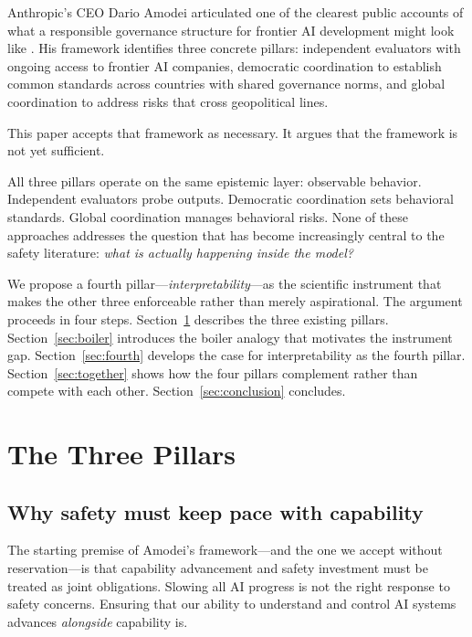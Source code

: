 \documentclass[12pt]{article}
\begin{document}
Anthropic's CEO Dario Amodei articulated one of the clearest public accounts
of what a responsible governance structure for frontier AI development might
look like \cite{amodei2025pace}. His framework identifies three concrete
pillars: independent evaluators with ongoing access to frontier AI companies,
democratic coordination to establish common standards across countries with
shared governance norms, and global coordination to address risks that cross
geopolitical lines.

This paper accepts that framework as necessary. It argues that the framework
is not yet sufficient.

All three pillars operate on the same epistemic layer: observable behavior.
Independent evaluators probe outputs. Democratic coordination sets behavioral
standards. Global coordination manages behavioral risks. None of these
approaches addresses the question that has become increasingly central to the
safety literature: \emph{what is actually happening inside the model?}

We propose a fourth pillar---\emph{interpretability}---as the scientific
instrument that makes the other three enforceable rather than merely
aspirational. The argument proceeds in four steps. Section~\ref{sec:pillars}
describes the three existing pillars. Section~\ref{sec:boiler} introduces the
boiler analogy that motivates the instrument gap. Section~\ref{sec:fourth}
develops the case for interpretability as the fourth pillar.
Section~\ref{sec:together} shows how the four pillars complement rather than
compete with each other. Section~\ref{sec:conclusion} concludes.

\section{The Three Pillars}
\label{sec:pillars}

\subsection{Why safety must keep pace with capability}

The starting premise of Amodei's framework---and the one we accept without
reservation---is that capability advancement and safety investment must be
treated as joint obligations. Slowing all AI progress is not the right
response to safety concerns. Ensuring that our ability to understand and
control AI systems advances \emph{alongside} capability is.
\end{document}
